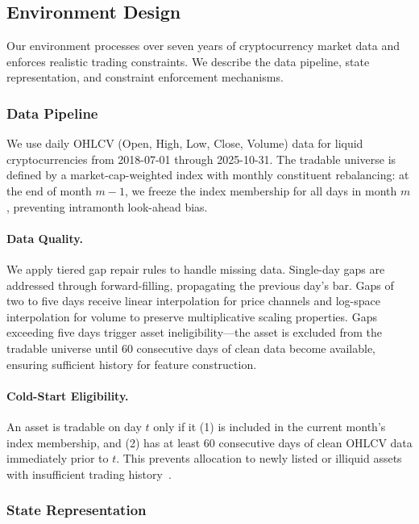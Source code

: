 \subsection{Environment Design}
\label{sec:environment}

Our environment processes over seven years of cryptocurrency market data and enforces realistic trading constraints. We describe the data pipeline, state representation, and constraint enforcement mechanisms.

\subsubsection{Data Pipeline}

We use daily OHLCV (Open, High, Low, Close, Volume) data for liquid cryptocurrencies from 2018-07-01 through 2025-10-31. The tradable universe is defined by a market-cap-weighted index with monthly constituent rebalancing: at the end of month $m-1$, we freeze the index membership for all days in month $m$, preventing intramonth look-ahead bias.

\paragraph{Data Quality.} We apply tiered gap repair rules to handle missing data. Single-day gaps are addressed through forward-filling, propagating the previous day's bar. Gaps of two to five days receive linear interpolation for price channels and log-space interpolation for volume to preserve multiplicative scaling properties. Gaps exceeding five days trigger asset ineligibility---the asset is excluded from the tradable universe until 60 consecutive days of clean data become available, ensuring sufficient history for feature construction.

\paragraph{Cold-Start Eligibility.} An asset is tradable on day $t$ only if it (1) is included in the current month's index membership, and (2) has at least 60 consecutive days of clean OHLCV data immediately prior to $t$. This prevents allocation to newly listed or illiquid assets with insufficient trading history~\citep{jiang2017eIIE, ye2020sarl}.

\subsubsection{State Representation}


